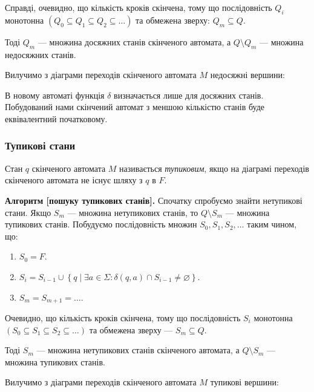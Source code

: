 Справді, очевидно, що кількість кроків скінчена, тому що послідовність $Q_i$ монотонна $\left(Q_0 \subseteq Q_1 \subseteq Q_2 \subseteq \ldots\right)$ та обмежена зверху: $Q_m \subseteq Q$. \medskip

Тоді $Q_m$ --- множина досяжних станів скінченого автомата, а $Q\setminus Q_m$ --- множина недосяжних станів. \medskip

Вилучимо з діаграми переходів скінченого автомата $M$ недосяжні вершини:
\begin{figure}[H]
	\centering
	
\end{figure}

В новому автоматі функція $\delta$ визначається лише для досяжних станів. Побудований нами скінчений автомат з меншою кількістю станів буде еквівалентний початковому.

\subsubsection{Тупикові стани}

Стан $q$ скінченого автомата $M$ називається \textit{тупиковим}, якщо на діаграмі переходів скінченого автомата не існує шляху з $q$ в $F$. \medskip

\textbf{Алгоритм [пошуку тупикових станів].} Спочатку спробуємо знайти нетупикові стани. Якщо $S_m$ --- множина нетупикових станів, то $Q \setminus S_m$ --- множина тупикових станів. Побудуємо послідовність множин $S_0, S_1, S_2, \ldots$ таким чином, що:
\begin{enumerate}
	\item $S_0 = F$.
	\item $S_i = S_{i - 1} \cup \left\{ q \mid \exists a \in \Sigma: \delta(q, a) \cap S_{i - 1} \ne \varnothing \right\}$.
	\item $S_m = S_{m + 1} = \ldots$.
\end{enumerate}

Очевидно, що кількість кроків скінчена, тому що послідовність $S_i$ монотонна $\left(S_0 \subseteq S_1 \subseteq S_2 \subseteq \ldots\right)$ та обмежена зверху --- $S_m \subseteq Q$. \medskip

Тоді $S_m$ --- множина нетупикових станів скінченого автомата, а $Q \setminus S_m$ --- множина тупикових станів.  \medskip

Вилучимо з діаграми переходів скінченого автомата $M$ тупикові вершини:
\begin{figure}[H]
	\centering
	
\end{figure}

